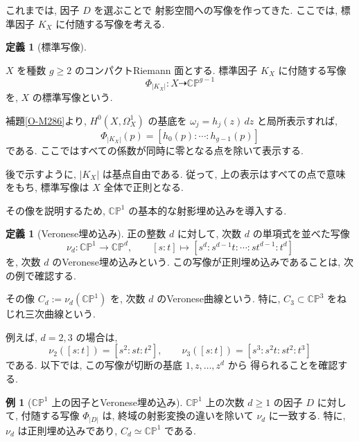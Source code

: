 \documentclass[dvipdfmx,a4paper,11pt]{article} %
\newcommand{\C}{\mathbb{C}}
\theoremstyle{definition}
\numberwithin{equation}{section}
\newtheorem{dfn}[thm]{定義}
\newtheorem{exa}[thm]{例}
\begin{document}
これまでは, 因子 $D$ を選ぶことで
射影空間への写像を作ってきた.
ここでは, 標準因子 $K_X$ に付随する写像を考える.

\begin{dfn}[標準写像]\label{O-M364}

$X$ を種数 $g\geq2$ のコンパクトRiemann 面とする.
標準因子 $K_X$ に付随する写像
\[
\Phi_{|K_X|}:X\dashrightarrow\C\mathbb P^{g-1}
\]
を, $X$ の標準写像という.

補題\ref{O-M286}より, $H^0(X,\Omega_X^1)$ の基底を
$\omega_j=h_j(z)\,dz$ と局所表示すれば,
\[
\Phi_{|K_X|}(p)=[h_0(p):\cdots:h_{g-1}(p)]
\]
である. ここではすべての係数が同時に零となる点を除いて表示する.
\end{dfn}

後で示すように, $|K_X|$ は基点自由である.
従って, 上の表示はすべての点で意味をもち, 
標準写像は $X$ 全体で正則となる.

その像を説明するため, 
$\C\mathbb P^1$ の基本的な射影埋め込みを導入する.

\begin{dfn}[Veronese埋め込み]\label{O-M353}
正の整数 $d$ に対して, 次数 $d$ の単項式を並べた写像
\[
\nu_d:\C\mathbb P^1\longrightarrow\C\mathbb P^d,
\qquad
[s:t]\longmapsto[s^d:s^{d-1}t:\cdots:st^{d-1}:t^d]
\]
を, 次数 $d$ のVeronese埋め込みという.
この写像が正則埋め込みであることは, 次の例で確認する.

その像 $C_d:=\nu_d(\C\mathbb P^1)$ を,
次数 $d$ のVeronese曲線という.
特に, $C_3\subset\C\mathbb P^3$ をねじれ三次曲線という.
\end{dfn}

例えば, $d=2,3$ の場合は,
\[
\nu_2([s:t])=[s^2:st:t^2],\qquad
\nu_3([s:t])=[s^3:s^2t:st^2:t^3]
\]
である.
以下では, この写像が切断の基底 $1,z,\ldots,z^d$ から
得られることを確認する.

\begin{exa}[$\C\mathbb P^1$ 上の因子とVeronese埋め込み]
\label{O-M352}
$\C\mathbb P^1$ 上の次数 $d\geq1$ の因子 $D$ に対して,
付随する写像 $\Phi_{|D|}$ は,
終域の射影変換の違いを除いて $\nu_d$ に一致する.
特に, $\nu_d$ は正則埋め込みであり,
$C_d\simeq\C\mathbb P^1$ である.
\end{exa}
\end{document}
